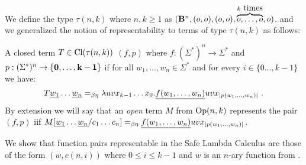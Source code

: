 We define the type $\tau(n,k)$ where $n, k\geq1$ as $(\mathbf{B}^n,(o,o),(o,o),\overbrace{o,\ldots,o}^{k\hbox{ times}},o)$.
and we generalized the notion of representability to terms of type $\tau(n,k)$ as follows: 
\begin{definition}
A closed term $T\in{\rm Cl}(\tau(n,k))$ 
$(f,p)$ where $f:(\Sigma^*)^n \rightarrow \Sigma^*$ and $p:(\Sigma^*)^n \rightarrow \{\mathbf{0}, \ldots, \mathbf{k-1}\}$ if for all $w_1,\ldots,w_n\in\Sigma^*$
and for every $i\in \{0\ldots,k-1\}$ we have:
$$
T \zaioncencode{w_1} \ldots \zaioncencode{w_n} =_{\beta\eta} \lambda u v x_{k-1}\ldots x_0 . \zaioncencode{f(w_1,\ldots,w_n)} u v x_{|p(w_1,\ldots,w_n)|} \ .
$$
By extension we will say that an \emph{open} term $M$ from ${\rm Op}(n,k)$
represents the pair $(f,p)$
iif $M[\underline{w_1}\ldots \underline{w_n}/c_1\ldots c_n] =_{\beta\eta} \underline{f(w_1,\ldots,w_n)} u v x_{|p(w_1,\ldots,w_n)|}$.
\end{definition}



\begin{theorem}
\label{thm:zaionc_pair_characterization_safe}
We show that function pairs representable in the
Safe Lambda Calculus are those of the form $(w,c(n,i))$ where
$0\leq i\leq k-1$ and $w$ is an $n$-ary function from \safedefset.
\end{theorem}

